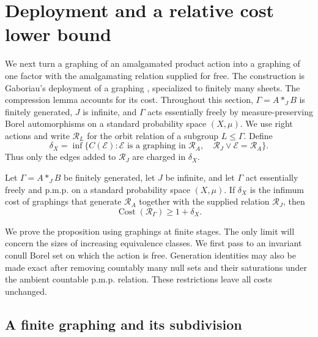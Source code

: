\section{Deployment and a relative cost lower bound}
\label{deployment:section}

We next turn a graphing of an amalgamated product action into a graphing
of one factor with the amalgamating relation supplied for free.
The construction is Gaboriau's deployment of a graphing
\cite[\S\,IV.28--IV.32]{gaboriau-2000}, specialized to finitely
many sheets. The compression lemma accounts for its cost.
Throughout this section,
\(\Gamma=A*_{J}B\) is finitely generated, \(J\) is infinite, and
\(\Gamma\) acts essentially freely by measure-preserving Borel
automorphisms on a standard probability space \((X,\mu)\).
We use right actions and write \(\mathcal R_L\) for the
orbit relation of a subgroup \(L\leq\Gamma\).  Define
\[
 \delta_X=\inf\bigl\{C(\mathcal E):
   \mathcal E\text{ is a graphing in }\mathcal R_A,
   \quad\mathcal R_J\vee\mathcal E=\mathcal R_A\bigr\}.
\]
Thus only the edges added to \(\mathcal R_J\) are charged in
\(\delta_X\).

\begin{proposition}
\label{deployment:main}
Let $\Gamma=A*_J B$ be finitely generated, let $J$ be infinite, and
let $\Gamma$ act essentially freely and p.m.p. on a standard probability
space $(X,\mu)$. If $\delta_X$ is the infimum cost of graphings that
generate $\mathcal R_A$ together with the supplied relation
$\mathcal R_J$, then
\[
 \operatorname{Cost}(\mathcal R_\Gamma)\geq 1+\delta_X.
\]
\end{proposition}

We prove the proposition using graphings at finite stages.  The only
limit will concern the sizes of increasing equivalence classes.
We first pass to an invariant conull Borel set on which the action is
free.  Generation identities may also be made exact after removing
countably many null sets and their saturations under the ambient
countable p.m.p. relation.  These restrictions leave all costs unchanged.

\subsection{A finite graphing and its subdivision}
\label{deployment:finite}

